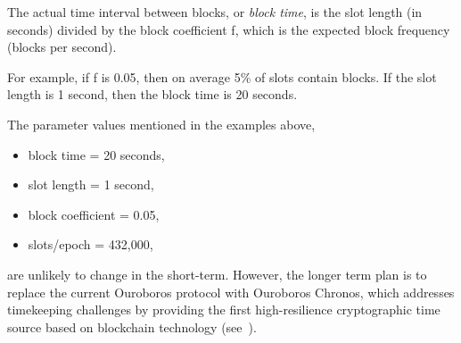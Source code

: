 \begin{definition}
  The actual time interval between blocks, or \emph{block time}, is the slot length
  (in seconds) divided by the block coefficient f, which is the expected block
  frequency (blocks per second).
\end{definition}
For example, if f is 0.05, then on average 5\% of slots contain blocks.
If the slot length is 1 second, then the block time is 20 seconds.

The parameter values mentioned in the examples above,
\begin{itemize}[noitemsep]
  \item block time = 20 seconds,
  \item slot length = 1 second,
  \item block coefficient = 0.05,
  \item slots/epoch = 432,000,
\end{itemize}
are unlikely to change in the short-term.  However, the longer term plan is to replace the current Ouroboros  protocol with Ouroboros Chronos, which addresses timekeeping challenges by providing the first
high-resilience cryptographic time source based on blockchain technology (see~\cite{www-iohk-blog-ouroboros}).
